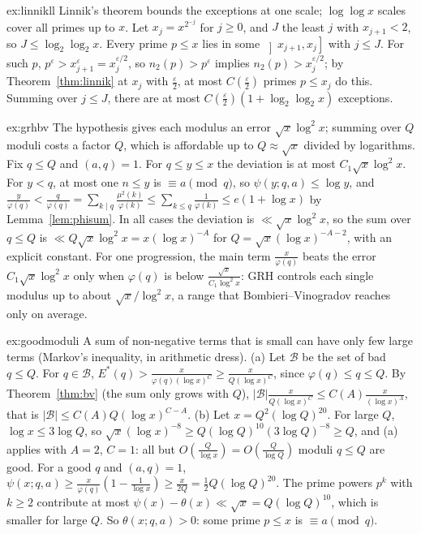 \begin{solution}{ex:linnikll}
\idea Linnik's theorem bounds the exceptions at one scale; $\log\log x$ scales cover all primes up to $x$.
\writeup Let $x_j=x^{2^{-j}}$ for $j\ge0$, and $J$ the least $j$ with $x_{j+1}<2$, so $J\le\log_2\log_2x$. Every prime $p\le x$ lies in some $\left]x_{j+1},x_j\right]$ with $j\le J$. For such $p$, $p^\varepsilon>x_{j+1}^\varepsilon=x_j^{\varepsilon/2}$, so $n_2(p)>p^\varepsilon$ implies $n_2(p)>x_j^{\varepsilon/2}$; by Theorem~\ref{thm:linnik} at $x_j$ with $\frac\varepsilon2$, at most $C(\frac\varepsilon2)$ primes $p\le x_j$ do this. Summing over $j\le J$, there are at most $C(\frac\varepsilon2)(1+\log_2\log_2x)$ exceptions.
\end{solution}

\begin{solution}{ex:grhbv}
\idea The hypothesis gives each modulus an error $\sqrt x\log^2x$; summing over $Q$ moduli costs a factor $Q$, which is affordable up to $Q\approx\sqrt x$ divided by logarithms.
\writeup Fix $q\le Q$ and $(a,q)=1$. For $q\le y\le x$ the deviation is at most $C_1\sqrt x\log^2x$. For $y<q$, at most one $n\le y$ is $\equiv a\pmod q$, so $\psi(y;q,a)\le\log y$, and $\frac y{\varphi(q)}<\frac q{\varphi(q)}=\sum_{k\mid q}\frac{\mu^2(k)}{\varphi(k)}\le\sum_{k\le q}\frac1{\varphi(k)}\le e(1+\log x)$ by Lemma~\ref{lem:phisum}. In all cases the deviation is $\ll\sqrt x\log^2x$, so the sum over $q\le Q$ is $\ll Q\sqrt x\log^2x=x(\log x)^{-A}$ for $Q=\sqrt x(\log x)^{-A-2}$, with an explicit constant.
For one progression, the main term $\frac x{\varphi(q)}$ beats the error $C_1\sqrt x\log^2x$ only when $\varphi(q)$ is below $\frac{\sqrt x}{C_1\log^2x}$: GRH controls each single modulus up to about $\sqrt x/\log^2x$, a range that Bombieri--Vinogradov reaches only on average.
\end{solution}

\begin{solution}{ex:goodmoduli}
\idea A sum of non-negative terms that is small can have only few large terms (Markov's inequality, in arithmetic dress).
\writeup (a) Let $\mathcal B$ be the set of bad $q\le Q$. For $q\in\mathcal B$, $E^*(q)>\frac x{\varphi(q)(\log x)^C}\ge\frac x{Q(\log x)^C}$, since $\varphi(q)\le q\le Q$. By Theorem~\ref{thm:bv} (the sum only grows with $Q$), $|\mathcal B|\frac x{Q(\log x)^C}\le C(A)\frac x{(\log x)^A}$, that is $|\mathcal B|\le C(A)Q(\log x)^{C-A}$.
(b) Let $x=Q^2(\log Q)^{20}$. For large $Q$, $\log x\le3\log Q$, so $\sqrt x(\log x)^{-8}\ge Q(\log Q)^{10}(3\log Q)^{-8}\ge Q$, and (a) applies with $A=2$, $C=1$: all but $O(\frac Q{\log x})=O(\frac Q{\log Q})$ moduli $q\le Q$ are good. For a good $q$ and $(a,q)=1$, $\psi(x;q,a)\ge\frac x{\varphi(q)}(1-\frac1{\log x})\ge\frac x{2Q}=\frac12Q(\log Q)^{20}$. The prime powers $p^k$ with $k\ge2$ contribute at most $\psi(x)-\theta(x)\ll\sqrt x=Q(\log Q)^{10}$, which is smaller for large $Q$. So $\theta(x;q,a)>0$: some prime $p\le x$ is $\equiv a\pmod q$.
\end{solution}

